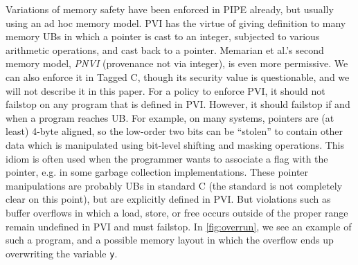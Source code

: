 \documentclass{llncs}
\begin{document}
{Variations of memory safety have been enforced in PIPE already, but usually using
an ad hoc memory model.
PVI has the virtue of giving definition to many memory UBs in which a pointer is
cast to an integer, subjected to various arithmetic operations, and cast back to a pointer.
Memarian et al.'s second memory model, {\it PNVI} (provenance not via integer), is even more permissive.
We can also enforce it in Tagged C, though its security value is questionable, and we will
not describe it in this paper.
For a policy to enforce PVI, it should not failstop on any program that is defined in PVI.
However, it should failstop if and when a program reaches UB. For example, on many systems,
pointers are (at least) 4-byte aligned, so the low-order two bits can be ``stolen'' to contain
other data which is manipulated using bit-level shifting and masking operations. 
This idiom is often used when the programmer wants to associate a flag with the pointer, e.g. in
some garbage collection implementations.\cite{??} 
These pointer manipulations are probably UBs in standard C (the standard is not completely clear on this point),
but are explicitly defined in PVI.  
But violations such as buffer overflows in which a load, store, or free 
occurs outside of the proper range remain undefined in PVI and must failstop. In \cref{fig:overrun},
we see an example of such a program, and a possible memory layout in which
the overflow ends up overwriting the variable {\tt y}.

\begin{figure}
\end{figure}}
\end{document}
